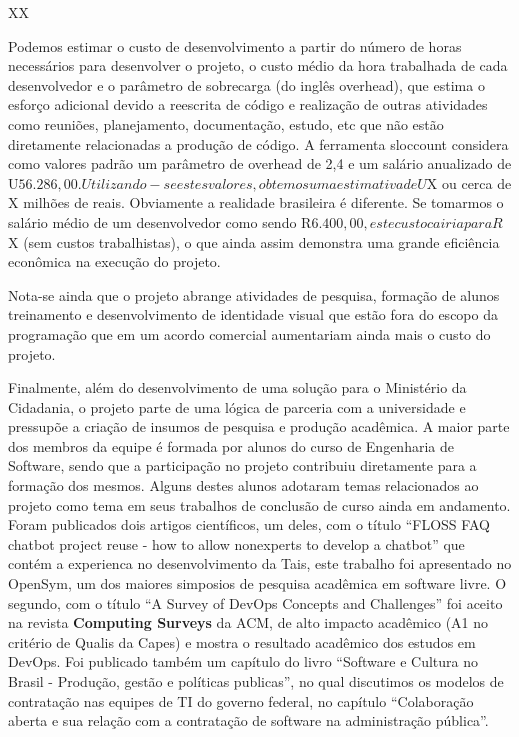 XX

Podemos estimar o custo de desenvolvimento a partir do número de horas
necessários para desenvolver o projeto, o custo médio da hora trabalhada
de cada desenvolvedor e o parâmetro de sobrecarga (do inglês overhead),
que estima o esforço adicional devido a reescrita de código e realização
de outras atividades como reuniões, planejamento, documentação, estudo,
etc que não estão diretamente relacionadas a produção de código. A
ferramenta sloccount considera como valores padrão um parâmetro de
overhead de 2,4 e um salário anualizado de
U\(56.286,00. Utilizando-se estes valores, obtemos uma estimativa de U\)X
ou cerca de X milhões de reais. Obviamente a realidade brasileira é
diferente. Se tomarmos o salário médio de um desenvolvedor como sendo
R\(6.400,00, este custo cairia para R\)X (sem custos trabalhistas), o
que ainda assim demonstra uma grande eficiência econômica na execução do
projeto.

Nota-se ainda que o projeto abrange atividades de pesquisa, formação de
alunos treinamento e desenvolvimento de identidade visual que estão fora
do escopo da programação que em um acordo comercial aumentariam ainda
mais o custo do projeto.

Finalmente, além do desenvolvimento de uma solução para o Ministério da
Cidadania, o projeto parte de uma lógica de parceria com a universidade
e pressupõe a criação de insumos de pesquisa e produção acadêmica. A
maior parte dos membros da equipe é formada por alunos do curso de
Engenharia de Software, sendo que a participação no projeto contribuiu
diretamente para a formação dos mesmos. Alguns destes alunos adotaram
temas relacionados ao projeto como tema em seus trabalhos de conclusão
de curso ainda em andamento. Foram publicados dois artigos científicos,
um deles, com o título ``FLOSS FAQ chatbot project reuse - how to allow
nonexperts to develop a chatbot'' que contém a experienca no
desenvolvimento da Tais, este trabalho foi apresentado no OpenSym, um
dos maiores simposios de pesquisa acadêmica em software livre. O
segundo, com o título ``A Survey of DevOps Concepts and Challenges'' foi
aceito na revista \textbf{Computing Surveys} da ACM, de alto impacto
acadêmico (A1 no critério de Qualis da Capes) e mostra o resultado
acadêmico dos estudos em DevOps. Foi publicado também um capítulo do
livro ``Software e Cultura no Brasil - Produção, gestão e políticas
publicas'', no qual discutimos os modelos de contratação nas equipes de
TI do governo federal, no capítulo ``Colaboração aberta e sua relação
com a contratação de software na administração pública''.

